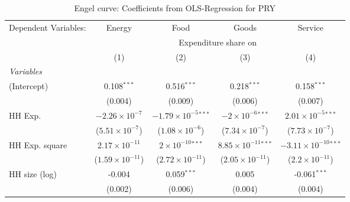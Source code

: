 
\begin{table}[htbp!]
   \centering
   \small
   \begin{adjustbox}{width = 1\textwidth, max height = 0.95\textheight, center}
      \begin{threeparttable}[b]
         \caption{\label{tab:Engel_parametric_PRY} Engel curve: Coefficients from OLS-Regression for PRY}
         \begin{tabular}{lcccc}
            \tabularnewline \midrule \midrule
            Dependent Variables: & Energy                   & Food                           & Goods                          & Service\\  
             & \multicolumn{4}{c}{Expenditure share on} \\ 
                                 & (1)                      & (2)                            & (3)                            & (4)\\  
            \midrule
            \emph{Variables}\\
            (Intercept)          & 0.108$^{***}$            & 0.516$^{***}$                  & 0.218$^{***}$                  & 0.158$^{***}$\\   
                                 & (0.004)                  & (0.009)                        & (0.006)                        & (0.007)\\   
            HH Exp.              & $-2.26\times 10^{-7}$    & $-1.79\times 10^{-5}$$^{***}$  & $-2\times 10^{-6}$$^{***}$     & $2.01\times 10^{-5}$$^{***}$\\    
                                 & ($5.51\times 10^{-7}$)   & ($1.08\times 10^{-6}$)         & ($7.34\times 10^{-7}$)         & ($7.73\times 10^{-7}$)\\    
            HH Exp. square       & $2.17\times 10^{-11}$    & $2\times 10^{-10}$$^{***}$     & $8.85\times 10^{-11}$$^{***}$  & $-3.11\times 10^{-10}$$^{***}$\\    
                                 & ($1.59\times 10^{-11}$)  & ($2.72\times 10^{-11}$)        & ($2.05\times 10^{-11}$)        & ($2.2\times 10^{-11}$)\\    
            HH size (log)        & -0.004                   & 0.059$^{***}$                  & 0.005                          & -0.061$^{***}$\\   
                                 & (0.002)                  & (0.006)                        & (0.004)                        & (0.004)\\   
            \midrule 

\end{tabular}
\end{threeparttable}
\end{adjustbox}
\end{table}
